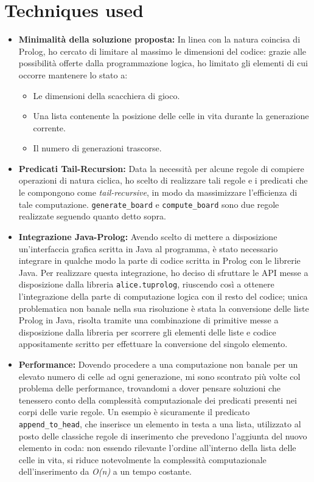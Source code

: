 \documentclass[10pt,italian]{article}
\begin{document}
\section{Techniques used}
\begin{itemize}
	\item \textbf{Minimalità della soluzione proposta:} In linea con la natura coincisa di Prolog, ho cercato di limitare al massimo le dimensioni del codice: grazie alle possibilità offerte dalla programmazione logica, ho limitato gli elementi di cui occorre mantenere lo stato a:
	\begin{itemize}
		\item Le dimensioni della scacchiera di gioco.
		\item Una lista contenente la posizione delle celle in vita durante la generazione corrente.
		\item Il numero di generazioni trascorse.
	\end{itemize}
	\item \textbf{Predicati Tail-Recursion:} Data la necessità per alcune regole di compiere operazioni di natura ciclica, ho scelto di realizzare tali regole e i predicati che le compongono come \textit{tail-recursive}, in modo da massimizzare l'efficienza di tale computazione. \texttt{generate\_board} e \texttt{compute\_board} sono due regole realizzate seguendo quanto detto sopra.
	\item \textbf{Integrazione Java-Prolog:} Avendo scelto di mettere a disposizione un'interfaccia grafica scritta in Java al programma, è stato necessario integrare in qualche modo la parte di codice scritta in Prolog con le librerie Java. Per realizzare questa integrazione, ho deciso di sfruttare le API messe a disposizione dalla libreria \texttt{alice.tuprolog}, riuscendo così a ottenere l'integrazione della parte di computazione logica con il resto del codice; unica problematica non banale nella sua risoluzione è stata la conversione delle liste Prolog in Java, risolta tramite una combinazione di primitive messe a disposizione dalla libreria per scorrere gli elementi delle liste e codice appositamente scritto per effettuare la conversione del singolo elemento.
	\item \textbf{Performance:} Dovendo procedere a una computazione non banale per un elevato numero di celle ad ogni generazione, mi sono scontrato più volte col problema delle performance, trovandomi a dover pensare soluzioni che tenessero conto della complessità computazionale dei predicati presenti nei corpi delle varie regole. Un esempio è sicuramente il predicato \texttt{append\_to\_head}, che inserisce un elemento in testa a una lista, utilizzato al posto delle classiche regole di inserimento che prevedono l'aggiunta del nuovo elemento in coda: non essendo rilevante l'ordine all'interno della lista delle celle in vita, si riduce notevolmente la complessità computazionale dell'inserimento da \textit{O(n)} a un tempo costante.\\
\end{itemize}
\end{document}

